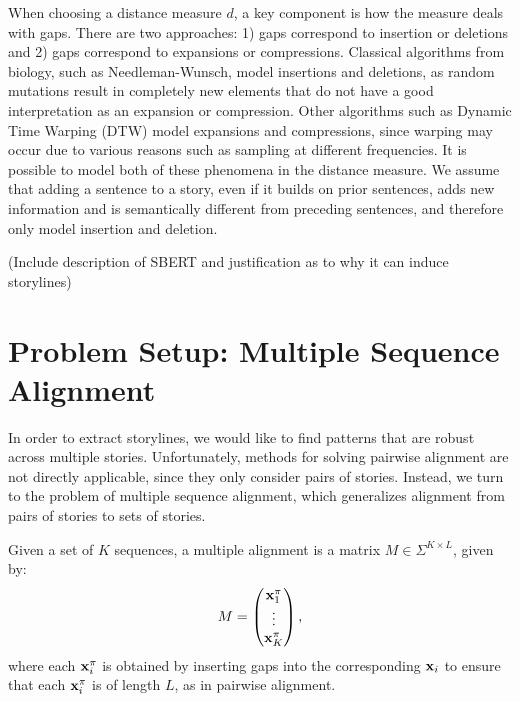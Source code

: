 \documentclass{article}
\begin{document}
When choosing a distance measure $d$, a key component is how the measure deals with gaps.
There are two approaches: 1) gaps correspond to insertion or deletions and 2) gaps
correspond to expansions or compressions.
Classical algorithms from biology, such as Needleman-Wunsch, model insertions and deletions,
as random mutations result in completely new elements that do not have a good interpretation
as an expansion or compression.
Other algorithms such as Dynamic Time Warping (DTW) model expansions and compressions,
since warping may occur due to various reasons such as sampling at different frequencies.
It is possible to model both of these phenomena in the distance measure.
We assume that adding a sentence to a story, even if it builds on prior sentences,
adds new information and is semantically different from preceding sentences,
and therefore only model insertion and deletion.

(Include description of SBERT and justification as to why it can induce storylines)

\section{Problem Setup: Multiple Sequence Alignment}
In order to extract storylines, we would like to find patterns that are robust across
multiple stories. 
Unfortunately, methods for solving pairwise alignment are not directly applicable, since they
only consider pairs of stories.
Instead, we turn to the problem of multiple sequence alignment,
which generalizes alignment from pairs of stories to sets of stories.

Given a set of $K$ sequences,
a multiple alignment is a matrix $M \in \Sigma^{K \times L}$, given by:
\begin{equation}
M = \begin{pmatrix}
    \mathbf{x}_1^\pi \\
    \vdots \\
    \mathbf{x}_K^\pi
\end{pmatrix},
\end{equation}
where each $\mathbf{x}_i^\pi$ is obtained by inserting gaps into the corresponding $\mathbf{x}_i$
to ensure that each $\mathbf{x}_i^\pi$ is of length $L$, as in pairwise alignment.
\end{document}

